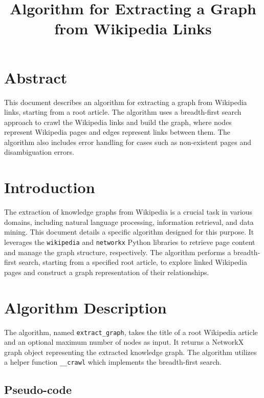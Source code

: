 \documentclass{article}
\title{Algorithm for Extracting a Graph from Wikipedia Links}
\author{}
\date{}
\begin{document}
	
	\maketitle
	
	\section{Abstract}
	
	This document describes an algorithm for extracting a graph from Wikipedia links, starting from a root article. The algorithm uses a breadth-first search approach to crawl the Wikipedia links and build the graph, where nodes represent Wikipedia pages and edges represent links between them.  The algorithm also includes error handling for cases such as non-existent pages and disambiguation errors.
	
	\section{Introduction}
	
	The extraction of knowledge graphs from Wikipedia is a crucial task in various domains, including natural language processing, information retrieval, and data mining. This document details a specific algorithm designed for this purpose. It leverages the \texttt{wikipedia} and \texttt{networkx} Python libraries to retrieve page content and manage the graph structure, respectively. The algorithm performs a breadth-first search, starting from a specified root article, to explore linked Wikipedia pages and construct a graph representation of their relationships.
	
	\section{Algorithm Description}
	
	The algorithm, named \texttt{extract\_graph}, takes the title of a root Wikipedia article and an optional maximum number of nodes as input. It returns a NetworkX graph object representing the extracted knowledge graph. The algorithm utilizes a helper function \texttt{\_\_crawl} which implements the breadth-first search.
	
	\subsection{Pseudo-code}
	
\end{document}
